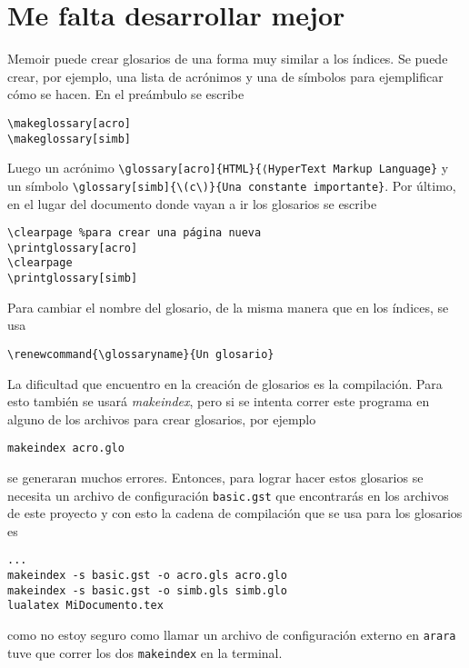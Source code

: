 \section{Me falta desarrollar mejor}
Memoir puede crear glosarios de una forma muy similar a los índices. Se puede crear, por ejemplo, una lista de acrónimos y una de símbolos para
ejemplificar cómo se hacen. En el preámbulo se escribe
\begin{flushleft}
  \verb|\makeglossary[acro]|\\
  \verb|\makeglossary[simb]|
\end{flushleft}
Luego un acrónimo \verb|\glossary[acro]{HTML}{⟨HyperText Markup Language}| y un
símbolo \verb|\glossary[simb]{\(c\)}{Una constante importante}|. Por último,
en el lugar del documento donde vayan a ir los glosarios se escribe
\begin{flushleft}
  \verb|\clearpage %para crear una página nueva|\\
  \verb|\printglossary[acro]|\\
  \verb|\clearpage|\\
  \verb|\printglossary[simb]|
\end{flushleft}
Para cambiar el nombre del glosario, de la misma manera que en los índices, se usa
\begin{flushleft}
  \verb|\renewcommand{\glossaryname}{Un glosario}|
\end{flushleft}

La dificultad que encuentro en la creación de glosarios es la compilación.
Para esto también se usará \textit{makeindex}, pero si se intenta correr
este programa en alguno de los archivos para crear glosarios, por ejemplo
\begin{flushleft}
  \verb|makeindex acro.glo|
\end{flushleft}
se generaran muchos errores. Entonces, para lograr hacer estos glosarios se
necesita un archivo de configuración \texttt{basic.gst} que encontrarás en
los archivos de este proyecto y con esto la cadena de compilación que se usa para los glosarios es
\begin{flushleft}
  \verb|...|\\
  \verb|makeindex -s basic.gst -o acro.gls acro.glo|\\
  \verb|makeindex -s basic.gst -o simb.gls simb.glo|\\
  \verb|lualatex MiDocumento.tex|
\end{flushleft}
como no estoy seguro como llamar un archivo de configuración externo en
\texttt{arara} tuve que correr los dos \texttt{makeindex} en la terminal.

